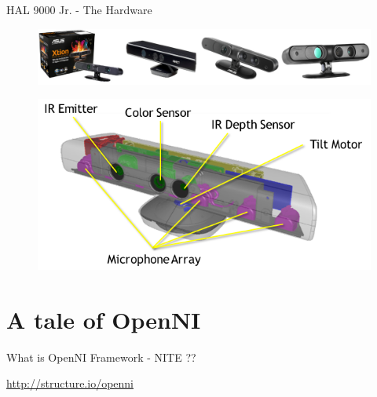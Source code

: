 \documentclass[bigger]{beamer}
\begin{document}
\begin{frame}[t]{ HAL 9000 Jr. - The Hardware}
\begin{figure}
		\includegraphics[scale = 0.3]{Imagenes/3dsensors.png}
\end{figure}
\begin{figure}
		\includegraphics[scale = 0.4]{Imagenes/component.png}
\end{figure}
\end{frame}

\section{A tale of OpenNI}
\begin{frame}[fragile]{ What is OpenNI Framework - NITE ??}
\begin{center}
\url{http://structure.io/openni}
\end{center}
\end{frame}
\end{document}
